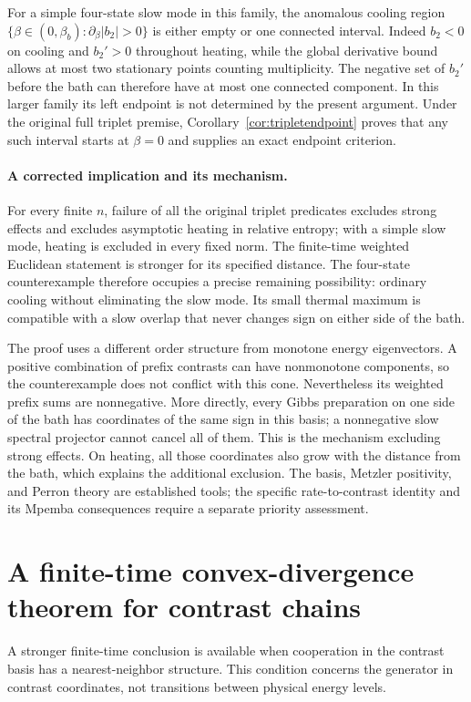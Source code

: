\documentclass[11pt]{article}
\begin{document}
For a simple four-state slow mode in this family, the anomalous cooling
region $\{\beta\in(0,\beta_b):\partial_\beta|b_2|>0\}$ is either empty or
one connected interval. Indeed $b_2<0$ on cooling and $b_2'>0$ throughout
heating, while the global derivative bound allows at most two stationary
points counting multiplicity. The negative set of $b_2'$ before the bath can therefore have at most
one connected component. In this larger family its left endpoint is not
determined by the present argument. Under the original full triplet premise,
Corollary~\ref{cor:tripletendpoint} proves that any such interval starts at
$\beta=0$ and supplies an exact endpoint criterion.

\paragraph{A corrected implication and its mechanism.}
For every finite $n$, failure of all the original triplet predicates excludes
strong effects and excludes asymptotic heating in relative entropy; with a
simple slow mode, heating is excluded in every fixed norm. The finite-time
weighted Euclidean statement is stronger for its specified distance. The
four-state counterexample therefore occupies a precise remaining possibility:
ordinary cooling without eliminating the slow mode. Its small thermal maximum
is compatible with a slow overlap that never changes sign on either side of
the bath.

The proof uses a different order structure from monotone energy eigenvectors.
A positive combination of prefix contrasts can have nonmonotone components,
so the counterexample does not conflict with this cone. Nevertheless its
weighted prefix sums are nonnegative. More directly, every Gibbs preparation
on one side of the bath has coordinates of the same sign in this basis; a
nonnegative slow spectral projector cannot cancel all of them. This is the
mechanism excluding strong effects. On heating, all those coordinates also
grow with the distance from the bath, which explains the additional exclusion.
The basis, Metzler positivity, and Perron theory are established tools; the
specific rate-to-contrast identity and its Mpemba consequences require a
separate priority assessment.

\section{A finite-time convex-divergence theorem for contrast chains}
\label{sec:contrastchainentropy}
A stronger finite-time conclusion is available when cooperation in the
contrast basis has a nearest-neighbor structure. This condition concerns
the generator in contrast coordinates, not transitions between physical
energy levels.
\end{document}
